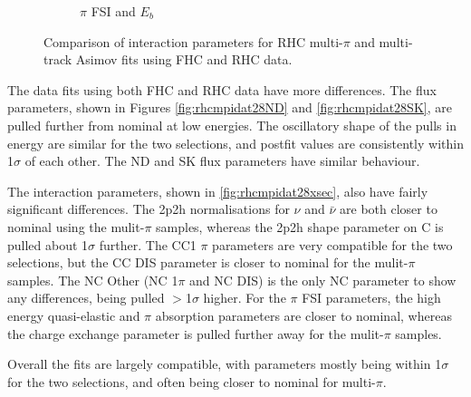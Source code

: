 \begin{figure}[t]
\begin{subfigure}{0.49\textwidth}
  \caption{$\pi$ FSI and $E_b$}
\end{subfigure}
\caption{Comparison of interaction parameters for RHC multi-$\pi$ and multi-track Asimov fits using FHC and RHC data.}
\label{fig:rhcmpiasmvxsec}
\end{figure}

The data fits using both FHC and RHC data have more differences. The flux parameters, shown in Figures \ref{fig:rhcmpidat28ND} and \ref{fig:rhcmpidat28SK}, are pulled further from nominal at low energies. The oscillatory shape of the pulls in energy are similar for the two selections, and postfit values are consistently within 1$\sigma$ of each other. The ND and SK flux parameters have similar behaviour.
 
The interaction parameters, shown in \ref{fig:rhcmpidat28xsec}, also have fairly significant differences. The 2p2h normalisations for $\nu$ and $\bar{\nu}$ are both closer to nominal using the mulit-$\pi$ samples, whereas the 2p2h shape parameter on C is pulled about 1$\sigma$ further. The CC1 $\pi$ parameters are very compatible for the two selections, but the CC DIS parameter is closer to nominal for the mulit-$\pi$ samples. The NC Other (NC 1$\pi$ and NC DIS) is the only NC parameter to show any differences, being pulled $>$1$\sigma$ higher. For the $\pi$ FSI parameters, the high energy quasi-elastic and $\pi$ absorption parameters are closer to nominal, whereas the charge exchange parameter is pulled further away for the mulit-$\pi$ samples.

Overall the fits are largely compatible, with parameters mostly being within 1$\sigma$ for the two selections, and often being closer to nominal for multi-$\pi$.

